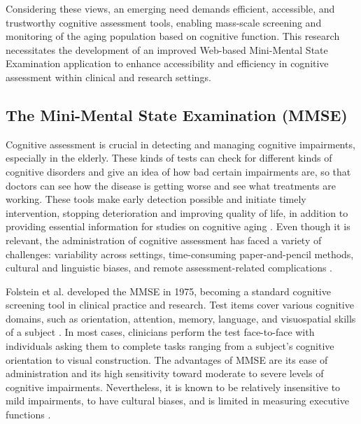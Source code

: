 Considering these views, an emerging need demands efficient, accessible, and trustworthy cognitive assessment tools, enabling mass-scale screening and monitoring of the aging population based on cognitive function. This research necessitates the development of an improved Web-based Mini-Mental State Examination application to enhance accessibility and efficiency in cognitive assessment within clinical and research settings.

\subsection{ The Mini-Mental State Examination (MMSE)}

Cognitive assessment is crucial in detecting and managing cognitive impairments, especially in the elderly. These kinds of tests can check for different kinds of cognitive disorders and give an idea of how bad certain impairments are, so that doctors can see how the disease is getting worse and see what treatments are working. These tools make early detection possible and initiate timely intervention, stopping deterioration and improving quality of life, in addition to providing essential information for studies on cognitive aging \cite{Langa2015, Petersen2018, Weintraub2009}. Even though it is relevant, the administration of cognitive assessment has faced a variety of challenges: variability across settings, time-consuming paper-and-pencil methods, cultural and linguistic biases, and remote assessment-related complications \cite{Prince2013, Cordell2013, Henrich2010, Goldberg2015, Geddes2020, Bilder2020}.

Folstein et al. \cite{Folstein1975} developed the MMSE in 1975, becoming a standard cognitive screening tool in clinical practice and research. Test items cover various cognitive domains, such as orientation, attention, memory, language, and visuospatial skills of a subject \cite{Folstein1975, Tombaugh1992, Shulman2006}. In most cases, clinicians perform the test face-to-face with individuals asking them to complete tasks ranging from a subject's cognitive orientation to visual construction. The advantages of MMSE are its ease of administration and its high sensitivity toward moderate to severe levels of cognitive impairments. Nevertheless, it is known to be relatively insensitive to mild impairments, to have cultural biases, and is limited in measuring executive functions \cite{Folstein1975}.

